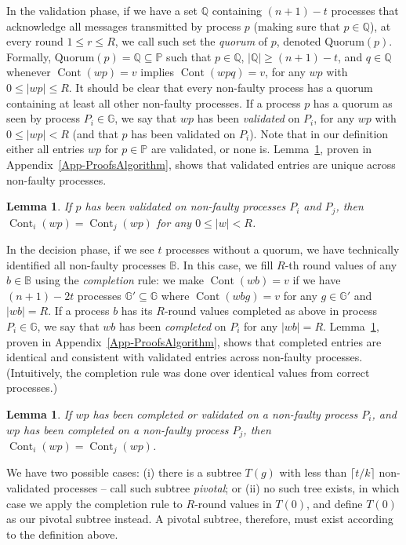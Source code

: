 \documentclass[11pt]{article}
\newcommand{\bbB}{\ensuremath{\mathbb{B}}}
\newcommand{\bbG}{\ensuremath{\mathbb{G}}}
\newcommand{\bbP}{\ensuremath{\mathbb{P}}}
\newcommand{\bbQ}{\ensuremath{\mathbb{Q}}}
\newtheorem{lemma}[theorem]{Lemma}
\newcommand{\quorum}[1]{{\textrm{Quorum}({#1})}}
\DeclareMathOperator{\cont}{Cont}
\begin{document}
In the validation phase,
if we have a set $\bbQ$ containing $(n + 1) - t$ processes that acknowledge
all messages transmitted by process $p$ (making sure that $p \in \bbQ$),
at every round $1 \le r \le R$,
we call such set the \emph{quorum} of $p$,
denoted $\quorum{p}$.
Formally,
$\quorum{p} = \bbQ \subseteq \bbP$
such that $p \in \bbQ$,
$|\bbQ| \ge (n + 1) - t$,
and $q \in \bbQ$ whenever $\cont(wp) = v$ implies $\cont(wpq) = v$,
for any $wp$ with $0 \le |wp| \le R$.
It should be clear that every non-faulty process has a quorum containing at least
all other non-faulty processes.
If a process $p$ has a quorum as seen by process $P_i \in \bbG$,
we say that $wp$ has been \emph{validated} on $P_i$,
for any $wp$ with $0 \le |wp| < R$
(and that $p$ has been validated on $P_i$).
Note that in our definition either all entries $wp$ for $p \in \bbP$ are validated,
or none is.
Lemma~\ref{lemma-validated-identical},
proven in Appendix~\ref{App-ProofsAlgorithm},
shows that validated entries are unique across non-faulty processes.
\begin{lemma}
\label{lemma-validated-identical}
If $p$ has been validated on non-faulty processes $P_i$ and $P_j$,
then $\cont_i(wp) = \cont_j(wp)$ for any $0 \le |w| < R$.
\end{lemma}


In the decision phase,
if we see $t$ processes without a quorum,
we have technically identified all non-faulty processes $\bbB$.
In this case,
we fill $R$-th round values of any $b \in \bbB$ using the \emph{completion} rule:
we make $\cont(wb) = v$ if we have $(n + 1) - 2t$ processes $\bbG' \subseteq \bbG$
where $\cont(wbg) = v$
for any $g \in \bbG'$ and $|wb| = R$.
If a process $b$ has its $R$-round values
completed as above in process $P_i \in \bbG$,
we say that $wb$ has been \emph{completed} on $P_i$ for any $|wb| = R$.
Lemma~\ref{lemma-validated-completed},
proven in Appendix~\ref{App-ProofsAlgorithm},
shows that completed entries are identical and consistent
with validated entries across non-faulty processes.
(Intuitively,
the completion rule was done over identical values from correct processes.)
\begin{lemma}
\label{lemma-validated-completed}
If $wp$ has been completed or validated on a non-faulty process $P_i$,
and $wp$ has been completed on a non-faulty process $P_j$,
then $\cont_i(wp) = \cont_j(wp)$.
\end{lemma}


We have two possible cases:
(i) there is a subtree $T(g)$ with less than $\lceil t/k \rceil$
non-validated processes --
call such subtree \emph{pivotal};
or (ii) no such tree exists,
in which case we apply the completion rule to $R$-round values in $T(0)$,
and define $T(0)$ as our pivotal subtree instead.
A pivotal subtree, therefore, must exist according to the definition above.
\end{document}
